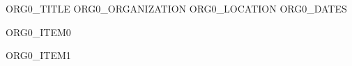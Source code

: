 
\begin{cventries}

  \cventry
    {ORG0_TITLE} %
    {ORG0_ORGANIZATION} %
    {ORG0_LOCATION} %
    {ORG0_DATES} %
    {
      \begin{cvitems} %
        \item {ORG0_ITEM0}
        \item {ORG0_ITEM1}
      \end{cvitems}
    }

\end{cventries}
